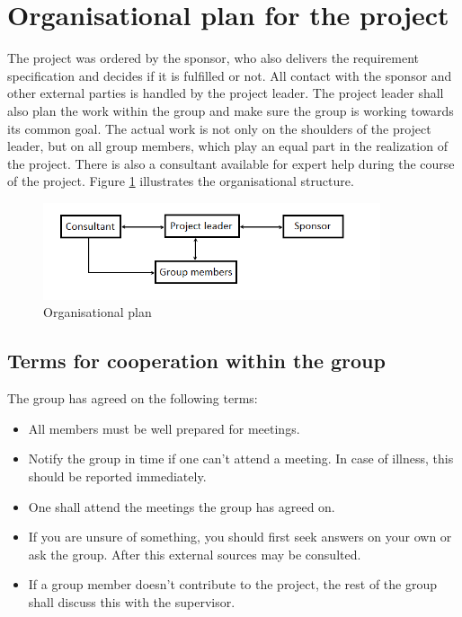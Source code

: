 \section{Organisational plan for the project}
The project was ordered by the sponsor, who also delivers the requirement specification and decides if it is fulfilled or not. All contact with the sponsor and other external parties is handled by the project leader. The project leader shall also plan the work within the group and make sure the group is working towards its common goal. The actual work is not only on the shoulders of the project leader, but on all group members, which play an equal part in the realization of the project. There is also a consultant available for expert help during the course of the project. Figure \ref{organisationsplan} illustrates the organisational structure.

\begin{figure}[H]
  \begin{center}
    \includegraphics[keepaspectratio=true,width=375px]{grafik/organisationsplan.png}
    \caption{Organisational plan}
    \label{organisationsplan}
  \end{center}
\end{figure}

\subsection{Terms for cooperation within the group}
The group has agreed on the following terms:

\begin{itemize}
\item{All members must be well prepared for meetings.}
\item{Notify the group in time if one can't attend a meeting. In case of illness, this should be reported immediately.}
\item{One shall attend the meetings the group has agreed on.}
\item{If you are unsure of something, you should first seek answers on your own or ask the group. After this external sources may be consulted.}
\item{If a group member doesn't contribute to the project, the rest of the group shall discuss this with the supervisor.}
\end{itemize}

\newpage
